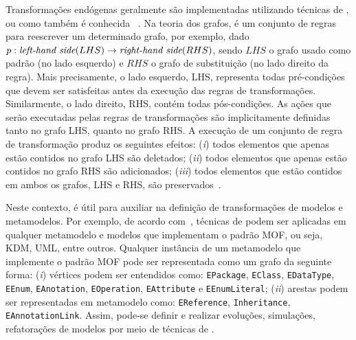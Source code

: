 Transformações endógenas geralmente são implementadas utilizando técnicas de , ou como também é conhecida ~\cite{Ehrig_2006}. Na teoria dos grafos,  é um conjunto de regras para reescrever um determinado grafo, por exemplo, dado $p: \emph{left-hand side} (LHS) \rightarrow \emph{right-hand side} (RHS)$, sendo $LHS$ o grafo usado como padrão (no lado esquerdo) e $RHS$ o grafo de substituição (no lado direito da regra). Mais precisamente, o lado esquerdo, LHS, representa todas pré-condições que devem ser satisfeitas antes da execução das regras de transformações. Similarmente, o lado direito, RHS, contém todas pós-condições. As ações que serão executadas pelas regras de transformações são implicitamente definidas tanto no grafo LHS, quanto no grafo RHS. A execução de um conjunto de regra de transformação produz os seguintes efeitos: (\textit{i}) todos elementos que apenas estão contidos no grafo LHS são deletados; (\textit{ii}) todos elementos que apenas estão contidos no grafo RHS são adicionados; (\textit{iii}) todos elementos que estão contidos em ambos os grafos, LHS e RHS, são preservados~\cite{Ehrig_2006}. 

Neste contexto,  é útil para auxiliar na definição de transformações de modelos e metamodelos. Por exemplo, de acordo com~, técnicas de  podem ser aplicadas em qualquer metamodelo e modelos que implementam o padrão MOF, ou seja, KDM, UML, entre outros. Qualquer instância de um metamodelo que implemente o padrão MOF pode ser representada como um grafo da seguinte forma: (\textit{i}) vértices podem ser entendidos como: \texttt{EPackage}, \texttt{EClass}, \texttt{EDataType}, \texttt{EEnum}, \texttt{EAnotation}, \texttt{EOperation}, \texttt{EAttribute} e \texttt{EEnumLiteral}; (\textit{ii}) arestas podem ser representadas em metamodelo como: \texttt{EReference}, \texttt{Inheritance}, \texttt{EAnnotationLink}. Assim, pode-se definir e realizar evoluções, simulações, refatorações de modelos por meio de técnicas de . 


